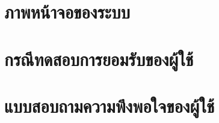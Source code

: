 \documentclass[progress2]{cskkuproject}
\begin{document}
\nocite{*}
\printreferences      %

\appendix             %
\chapter{ภาพหน้าจอของระบบ}


\chapter{กรณีทดสอบการยอมรับของผู้ใช้}


\chapter{แบบสอบถามความพึงพอใจของผู้ใช้}


\begin{biography}

\end{biography}
\end{document}
